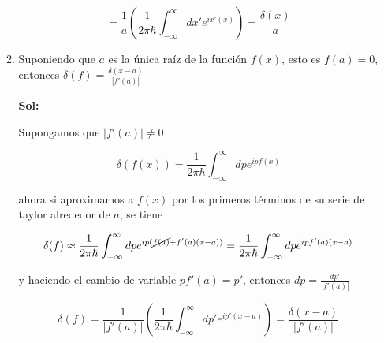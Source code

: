 \documentclass[12pt,a4paper]{article}
\begin{document}
\begin{enumerate}
\begin{enumerate}
        \begin{equation*}
            = \frac{1}{a}\left(\frac{1}{2 \pi \hbar} \int_{-\infty}^{\infty} dx' e^{ix'(x)} \right) = \frac{\delta(x)}{a}
        \end{equation*}
        
        \item Suponiendo que $a$ es la única raíz de la función $f(x)$, esto es $f(a)= 0$, entonces $\delta(f)= \frac{\delta(x-a)}{|f'(a )|}$
        
        \textbf{Sol:}
        
        Supongamos que $|f'(a)| \neq 0$
        
        \begin{equation*}
            \delta (f(x)) = \frac{1}{2\pi \hbar} \int_{-\infty}^{\infty} dp e^{ipf(x)}
        \end{equation*}
        
        ahora si aproximamos a $f(x)$ por los primeros términos de su serie de taylor alrededor de $a$, se tiene
        
        \begin{equation*}
            \delta (f) \approx \frac{1}{2\pi \hbar} \int_{-\infty}^{\infty} dp e^{ip(\cancel{f(a)}+f'(a) (x-a))} = \frac{1}{2\pi \hbar} \int_{-\infty}^{\infty} dp e^{ipf'(a) (x-a)}
        \end{equation*}
        
        y haciendo el cambio de variable $pf'(a)=p'$, entonces  $dp = \frac{dp'}{|f'(a)|}$
        
        \begin{equation*}
            \delta (f)  = \frac{1}{|f'(a)|}\left( \frac{1}{2\pi \hbar} \int_{-\infty}^{\infty} dp' e^{ip' (x-a)} \right) = \frac{\delta(x-a)}{|f'(a)|}
        \end{equation*}
        
        
        
        
        
    \end{enumerate}

\end{enumerate}
\end{document}
